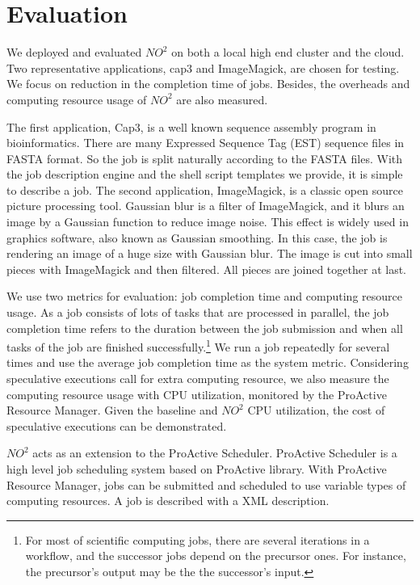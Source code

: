 \section{Evaluation}
We deployed and evaluated $NO^2$ on both a local high end cluster and the cloud. Two
representative applications, cap3 and ImageMagick, are chosen for testing. We focus on
reduction in the completion time of jobs. Besides, the overheads and computing resource usage of $NO^2$ are also measured.

The first application, Cap3, is a well known sequence assembly program in bioinformatics. There are many Expressed Sequence Tag (EST) sequence files in
FASTA format. So the job is split naturally according to the FASTA files. With the job
description engine and the shell script templates we provide, it is
simple to describe a job. The second application, ImageMagick, is a classic open
source picture processing tool. Gaussian blur is a filter of ImageMagick, and it blurs an
image by a Gaussian function to reduce image noise. This effect is widely used in graphics
software, also known as Gaussian smoothing. In this case, the job is rendering an image of
a huge size with Gaussian blur. The image is cut into small pieces with ImageMagick and
then filtered. All pieces are joined together at last.

We use two metrics for evaluation: job completion time and computing resource usage. As a
job consists of lots of tasks that are processed in parallel, the job completion time refers
to the duration between the job submission and when all tasks of the job are finished
successfully.\footnote{For most of scientific computing jobs, there are several iterations
in a workflow, and the successor jobs depend on the precursor ones. For instance, the
precursor's output may be the the successor's input.} We run a job repeatedly for several
times and use the average job completion time as the system metric. Considering
speculative executions call for extra computing resource, we also measure the computing
resource usage with CPU utilization, monitored by the ProActive Resource Manager. Given
the baseline and $NO^2$ CPU utilization, the cost of speculative executions can be
demonstrated.

$NO^2$ acts as an extension to the ProActive Scheduler. ProActive Scheduler is a high
level job scheduling system based on ProActive library. With ProActive Resource Manager,
jobs can be submitted and scheduled to use variable types of computing resources. A job is
described with a XML description.


